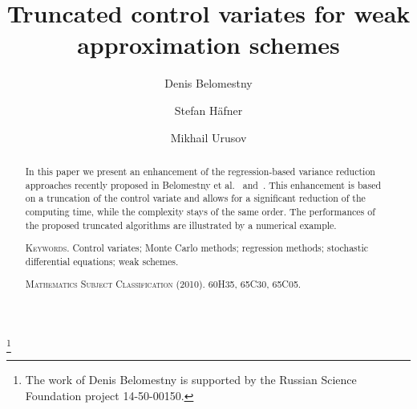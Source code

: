 \documentclass[11pt,a4paper]{amsart}
\theoremstyle{plain}
\theoremstyle{definition}
\theoremstyle{remark}
\numberwithin{equation}{section}
\begin{document}
\title{Truncated control variates for weak approximation schemes}\thanks{The work of Denis Belomestny is supported by the Russian Science Foundation project 14-50-00150.}

\author{Denis Belomestny}
\address{University of Duisburg-Essen, Essen, Germany and IITP RAS, Moscow, Russia}%

\author{Stefan H\"afner}
\address{PricewaterhouseCoopers GmbH, Frankfurt, Germany}

\author{Mikhail Urusov}
\address{University of Duisburg-Essen, Essen, Germany}


\begin{abstract}
In this paper we present an enhancement of the regression-based variance reduction approaches recently proposed in Belomestny et al.\ \cite{belomestny2016variance} and~\cite{belomestny2016stratified}.
This enhancement is based on a truncation of the control variate and allows for a significant reduction of the computing time, while the complexity stays of the same order.
The performances of the proposed truncated algorithms are illustrated by a numerical example.

\medskip\noindent
\textsc{Keywords.}
Control variates;
Monte Carlo methods;
regression methods;
stochastic differential equations;
weak schemes.

\medskip\noindent
\textsc{Mathematics Subject Classification (2010).}
60H35, 65C30, 65C05.
\end{abstract}

\maketitle
\end{document}
